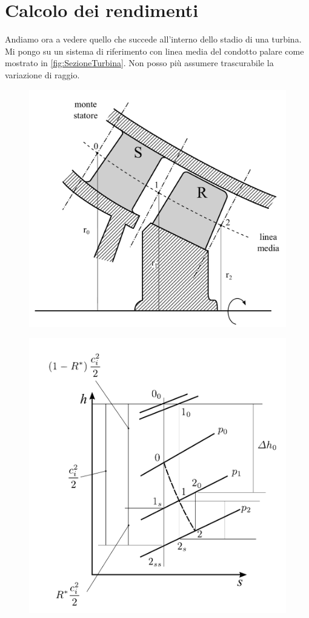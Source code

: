 \section{Calcolo dei rendimenti}
Andiamo ora a vedere quello che succede all'interno dello stadio di una turbina. Mi pongo su un sistema di riferimento con linea media del condotto palare come mostrato in \ref{fig:SezioneTurbina}. Non posso più assumere trascurabile la variazione di raggio. 
\begin{figure}
\centering
\begin{minipage}{.5\textwidth}
  \centering
  \includegraphics[width=.95\linewidth]{fig/SezioneTurbina.pdf}
  \label{fig:SezioneTurbina}
\end{minipage}%
\begin{minipage}{.5\textwidth}
  \centering
  \includegraphics[width=.95\linewidth]{fig/hsturbine.pdf}
  \label{fig:hsturbine}
\end{minipage}
\end{figure}

